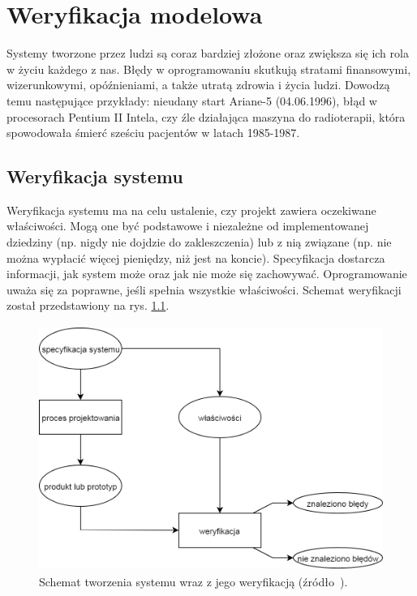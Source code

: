 \chapter{Weryfikacja modelowa}

Systemy tworzone przez ludzi są coraz bardziej złożone oraz zwiększa się ich rola w życiu każdego z nas.
Błędy w oprogramowaniu skutkują stratami finansowymi, wizerunkowymi, opóźnieniami, a także utratą zdrowia i życia ludzi. Dowodzą temu następujące przykłady: nieudany start Ariane-5 (04.06.1996), błąd w procesorach Pentium II Intela, czy źle działająca maszyna do radioterapii, która spowodowała śmierć sześciu pacjentów w latach 1985-1987.


\section{Weryfikacja systemu}

Weryfikacja systemu ma na celu ustalenie, czy projekt zawiera oczekiwane właściwości. Mogą one być podstawowe i niezależne od implementowanej dziedziny (np. nigdy nie dojdzie do zakleszczenia) lub z nią związane (np. nie można wypłacić więcej pieniędzy, niż jest na koncie). Specyfikacja dostarcza informacji, jak system może oraz jak nie może się zachowywać. Oprogramowanie uważa się za poprawne, jeśli spełnia wszystkie właściwości. Schemat weryfikacji został przedstawiony na rys. \ref{fig:system_verification_scheme}.

\begin{figure}[h]
    \centering
    \includegraphics[height=8cm,keepaspectratio]{img/system_verification_schematic_view.png}
    \caption{Schemat tworzenia systemu wraz z jego weryfikacją (źródło~\cite{Bai08}).}
    \label{fig:system_verification_scheme}
\end{figure}

